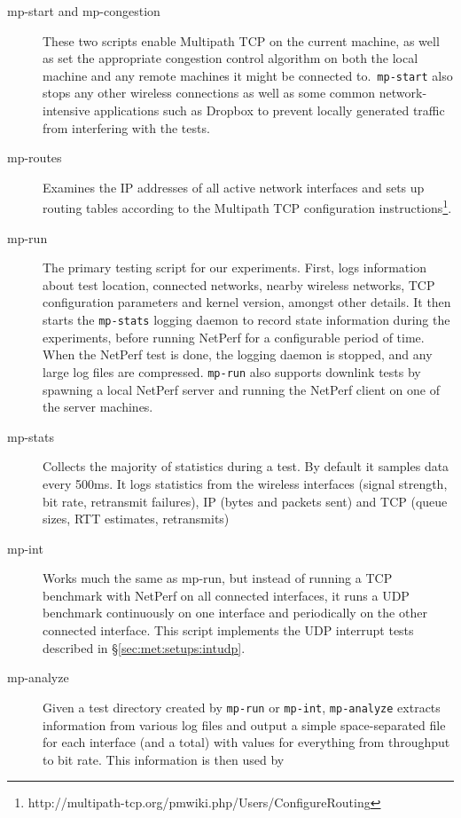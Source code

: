 \begin{description}
  \item[mp-start and mp-congestion]
    These two scripts enable Multipath TCP on the current machine, as well as
    set the appropriate congestion control algorithm on both the local machine
    and any remote machines it might be connected to.\ \texttt{mp-start} also
    stops any other wireless connections as well as some common
    network-intensive applications such as Dropbox to prevent locally generated
    traffic from interfering with the tests.
  \item[mp-routes]
    Examines the IP addresses of all active network interfaces and sets up
    routing tables according to the Multipath TCP configuration
    instructions\footnote{http://multipath-tcp.org/pmwiki.php/Users/ConfigureRouting}.
  \item[mp-run]
    The primary testing script for our experiments. First, logs information
    about test location, connected networks, nearby wireless networks, TCP
    configuration parameters and kernel version, amongst other details. It then
    starts the \texttt{mp-stats} logging daemon to record state information
    during the experiments, before running NetPerf for a configurable period of
    time. When the NetPerf test is done, the logging daemon is stopped, and any
    large log files are compressed. \texttt{mp-run} also supports downlink tests
    by spawning a local NetPerf server and running the NetPerf client on one of
    the server machines.
  \item[mp-stats]
    Collects the majority of statistics during a test. By default it samples
    data every 500ms. It logs statistics from the wireless interfaces (signal
    strength, bit rate, retransmit failures), IP (bytes and packets sent) and
    TCP (queue sizes, RTT estimates, retransmits)
  \item[mp-int]
    Works much the same as mp-run, but instead of running a TCP benchmark with
    NetPerf on all connected interfaces, it runs a UDP benchmark continuously on
    one interface and periodically on the other connected interface. This script
    implements the UDP interrupt tests described in
    \S\ref{sec:met:setups:intudp}.
  \item[mp-analyze]
    Given a test directory created by \texttt{mp-run} or \texttt{mp-int},
    \texttt{mp-analyze} extracts information from various log files and output a
    simple space-separated file for each interface (and a total) with values for
    everything from throughput to bit rate. This information is then used by

\end{description}

